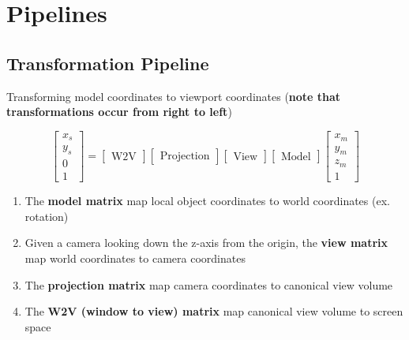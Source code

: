 \chapter{Pipelines}

\section{Transformation Pipeline}

  Transforming model coordinates to viewport coordinates (\textbf{note that
  transformations occur from right to left})

  \begin{equation}
    \begin{bmatrix}
      x_{s} \\
      y_{s} \\
      0 \\
      1
    \end{bmatrix}
    =
    \begin{bmatrix}
      \text{W2V}
    \end{bmatrix}
    \begin{bmatrix}
      \text{Projection}
    \end{bmatrix}
    \begin{bmatrix}
      \text{View}
    \end{bmatrix}
    \begin{bmatrix}
      \text{Model}
    \end{bmatrix}
    \begin{bmatrix}
      x_{m} \\
      y_{m} \\
      z_{m} \\
      1
    \end{bmatrix}
  \end{equation}

  \begin{enumerate}
    \item The \textbf{model matrix} map local object coordinates to
    world coordinates (ex. rotation)
    \item Given a camera looking down the z-axis from the origin,
    the \textbf{view matrix} map world coordinates to camera coordinates
    \item The \textbf{projection matrix} map camera coordinates to canonical
    view volume
    \item The \textbf{W2V (window to view) matrix} map canonical view volume
    to screen space
  \end{enumerate}


